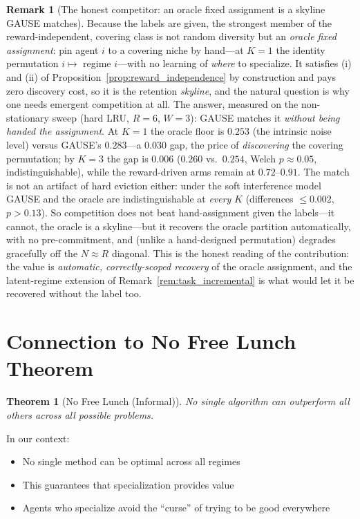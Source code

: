 \documentclass[11pt,a4paper]{article}
\theoremstyle{definition}
\newtheorem{remark}{Remark}[section]
\theoremstyle{plain}
\newtheorem{theorem}{Theorem}[section]
\begin{document}
\begin{remark}[The honest competitor: an oracle fixed assignment is a skyline GAUSE matches]
\label{rem:oracle}
Because the labels are given, the strongest member of the reward-independent,
covering class is not random diversity but an \emph{oracle fixed assignment}: pin
agent $i$ to a covering niche by hand---at $K{=}1$ the identity permutation
$i\mapsto$ regime $i$---with no learning of \emph{where} to specialize. It satisfies
(i) and (ii) of Proposition~\ref{prop:reward_independence} by construction and pays
zero discovery cost, so it is the retention \emph{skyline}, and the natural question
is why one needs emergent competition at all. The answer, measured on the
non-stationary sweep (hard LRU, $R{=}6$, $W{=}3$): GAUSE matches it \emph{without
being handed the assignment}. At $K{=}1$ the oracle floor is $0.253$ (the intrinsic
noise level) versus GAUSE's $0.283$---a $0.030$ gap, the price of \emph{discovering}
the covering permutation; by $K{=}3$ the gap is $0.006$ ($0.260$ vs.\ $0.254$, Welch
$p\approx0.05$, indistinguishable), while the reward-driven arms remain at
$0.72$--$0.91$. The match is not an artifact of hard eviction either: under the soft
interference model GAUSE and the oracle are indistinguishable at \emph{every} $K$
(differences $\le0.002$, $p>0.13$). So competition does not beat hand-assignment given
the labels---it cannot, the oracle is a skyline---but it recovers the oracle partition automatically,
with no pre-commitment, and (unlike a hand-designed permutation) degrades gracefully
off the $N\approx R$ diagonal. This is the honest reading of the contribution: the
value is \emph{automatic, correctly-scoped recovery} of the oracle assignment, and
the latent-regime extension of Remark~\ref{rem:task_incremental} is what would let it
be recovered without the label too.
\end{remark}

\section{Connection to No Free Lunch Theorem}

\begin{theorem}[No Free Lunch (Informal)]
No single algorithm can outperform all others across all possible problems.
\end{theorem}

\begin{keypoint}
In our context:
\begin{itemize}
    \item No single method can be optimal across all regimes
    \item This guarantees that specialization provides value
    \item Agents who specialize avoid the ``curse'' of trying to be good everywhere
\end{itemize}
\end{keypoint}
\end{document}
